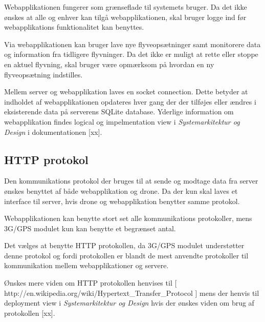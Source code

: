 Webapplikationen fungerer som grænseflade til systemets bruger. Da det ikke ønskes at alle og enhver kan tilgå webapplikationen, skal bruger logge ind før webapplikations funktionalitet kan benyttes. 

Via webapplikationen kan bruger lave nye flyveopsætninger samt monitorere data og information fra tidligere flyvninger. Da det ikke er muligt at rette eller stoppe en aktuel flyvning, skal bruger være opmærksom på hvordan en ny flyveopsætning indstilles. 

Mellem server og webapplikation laves en socket connection. Dette betyder at indholdet af webapplikationen opdateres hver gang der der tilføjes eller ændres i eksisterende data på serverens SQLite database. Yderlige information om webapplikation findes logical og impelmentation view i \textit{Systemarkitektur og Design} i dokumentationen [xx].


\subsection{HTTP protokol}

Den kommunikations protokol der bruges til at sende og modtage data fra server ønskes benyttet af både webapplikation og drone. Da der kun skal laves et interface til server, hvis drone og webapplikation benytter samme protokol.

Webapplikationen kan benytte stort set alle kommunikations protokoller, mens 3G/GPS modulet kun kan benytte et begrænset antal.

Det vælges at benytte HTTP protokollen, da 3G/GPS modulet understøtter denne protokol og fordi protokollen er blandt de mest anvendte protokoller til kommunikation mellem webapplikationer og servere.

Ønskes mere viden om HTTP protokollen henvises til [ http://en.wikipedia.org/wiki/Hypertext\_Transfer\_Protocol ] mens der henvis til deployment view i \textit{Systemarkitektur og Design} hvis der ønskes viden om brug af protokollen [xx]. 